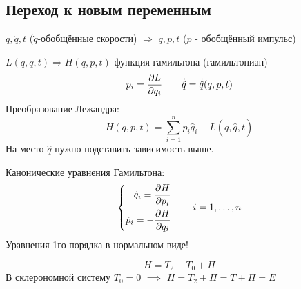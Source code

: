 \documentclass{article}
\begin{document}
\subsection{Переход к новым переменным}
$q,\dot{q},t$ ($\dot{q}$-обобщённые скорости) $\Rightarrow$ $q,p,t$ ($p$ - обобщённый импульс)

$L(\dot{q},q,t) \Rightarrow H(q,p,t)$ функция гамильтона (гамильтониан)
\[
  p_i=\frac{\partial{L}}{\partial{q_i}} \qquad \dot{\hat{q}}=\dot{\hat{q}}(q,p,t)
\]
Преобразование Лежандра:
\[
  H(q,p,t)=\sum_{i=1}^{n}p_i \dot{\hat{q}}_i - L(q, \dot{\hat q},t)
\]
На место $\dot{\hat q}$ нужно подставить зависимость выше.

Канонические уравнения Гамильтона:
\[
  \left\{\begin{aligned}
    \dot{q}_i=\frac{\partial{H}}{\partial{p_i}} \\ 
    \dot{p}_i=-\frac{\partial{H}}{\partial{q_i}}
  \end{aligned}\right. \qquad i=1,\dots ,n
\]
Уравнения 1го порядка в нормальном виде!

\[
  H=T_2-T_0+\Pi
\]
В склерономной систему $T_0=0$ $\implies$ $H=T_2+\Pi=T+\Pi=E$
\end{document}
